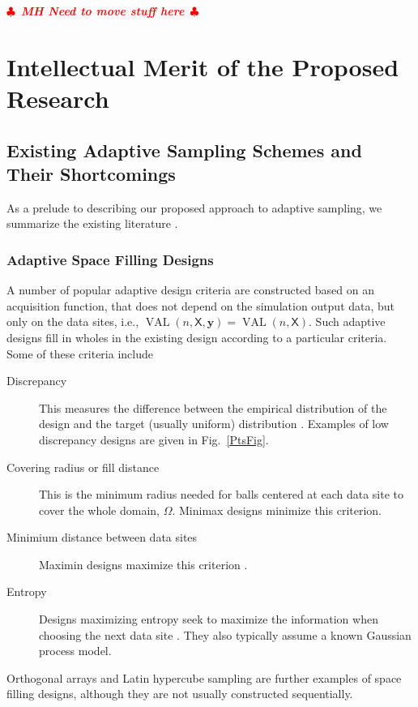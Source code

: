 \documentclass[11pt]{NSFamsart}
\DeclareMathOperator{\VAL}{VAL}
\newcommand{\mX}{\mathsf{X}}
\newcommand{\by}{{\boldsymbol{y}}}
\newif\ifnotesw \noteswtrue
\newcommand{\notes}[1]{\ifnotesw \textcolor{red}{  $\clubsuit$\ {\sf \bf \it  #1}\ $\clubsuit$  }\fi}
\begin{document}
\notes{MH Need to move stuff here}

\section{Intellectual Merit of the Proposed Research} \label{sec:Proposed}

\subsection{Existing Adaptive Sampling Schemes and Their Shortcomings} \label{sec:shortExist}

As a prelude to describing our proposed approach to adaptive sampling, we summarize the existing literature \cite{aute2013cross,burnaev2015adaptive,fu2017adaptive,gramacy2008adaptive,jin2002sequential,kleijnen2004application}.

\subsubsection{Adaptive Space Filling Designs}
A number of popular adaptive design criteria are constructed based on an acquisition function, that does not depend on the simulation output data, but only on the data sites, i.e., $\VAL(n,\mX,\by) = \VAL(n,\mX)$.  Such adaptive designs fill in wholes in the existing design according to a particular criteria.  Some of these criteria include 
\begin{description}
    \item[Discrepancy] This measures the difference between the empirical distribution of the design and the target (usually uniform) distribution \cite{FangEtal19a}.  Examples of low discrepancy designs are given in Fig.\ \ref{PtsFig}.  
    \item[Covering radius or fill distance] This is the minimum radius needed for balls centered at each data site to cover the whole domain, $\Omega$.  Minimax designs minimize this criterion.
    \item[Minimium distance between data sites]  Maximin designs maximize this criterion \cite{jin2002sequential}.
    \item[Entropy] Designs maximizing entropy seek to maximize the information when choosing the next data site \cite{jin2002sequential}.  They also typically assume a known Gaussian process model.
\end{description}
Orthogonal arrays and Latin hypercube sampling are further examples of space filling designs, although they are not usually constructed sequentially.  
\end{document}
